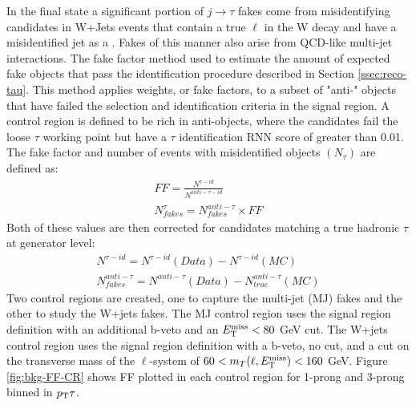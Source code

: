 		In the \taulep final state a significant portion of $j \rightarrow \tau$ fakes come from misidentifying \tauhad candidates in W+Jets events that contain a true $\ell$ in the W decay and have a misidentified jet as a \tauhad. Fakes of this manner also arise from QCD-like multi-jet interactions. The fake factor method used to estimate the amount of expected fake \tauhad objects that pass the \tauhad identification procedure described in Section \ref{ssec:reco-tau}. This method applies weights, or fake factors, to a subset of "anti-\tauhad" objects that have failed the selection and identification criteria in the signal region. A control region is defined to be rich in anti-\tauhad objects, where the \tauhad candidates fail the loose $\tau$ working point but have a $\tau$ identification RNN score of greater than 0.01. The fake factor and number of events with misidentified \tauhad objects $(N_{\tau})$ are defined as:
		\begin{equation}\label{eqn:ff}\begin{split}
		FF = \frac{ N^{\tau-id} }{N^{anti-\tau-id}} \\
		N_{fakes}^{\tau} = N^{anti-\tau}_{fakes} \times FF
		\end{split}\end{equation}
		Both of these values are then corrected for \tauhad candidates matching a true hadronic $\tau$ at generator level:
		\begin{equation}\label{eqn:ff-corrected}\begin{split}
		N^{\tau-id} = N^{\tau-id}(Data) - N^{\tau-id}(MC) \\
		N^{anti-\tau}_{fakes} = N^{anti-\tau}(Data) - N^{anti-\tau}_{true} (MC)
		\end{split}\end{equation}
		Two control regions are created, one to capture the multi-jet (MJ) fakes and the other to study the W+jets fakes. The MJ control region uses the \taujets signal region definition with an additional b-veto and an $E_\text{T}^\text{miss} < 80$ GeV cut. The W+jets control region uses the \taulep signal region definition with a b-veto, no \Etm cut, and a cut on the transverse mass of the $\ell$-\Etm system of $60 < m_{T}(\ell, E_\text{T}^\text{miss})<160$ GeV. Figure \ref{fig:bkg-FF-CR} shows FF plotted in each control region for 1-prong and 3-prong \tauhad binned in $p_{\text{T}}{\tau}$.
